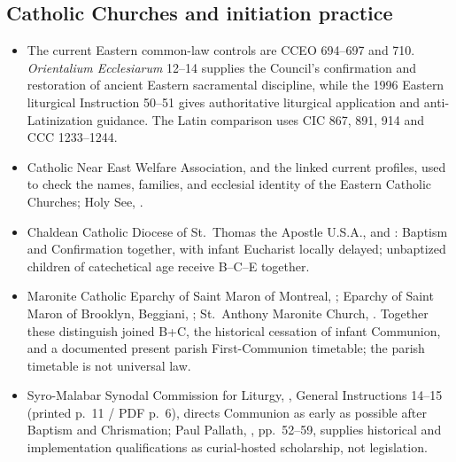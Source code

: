 \subsection*{Catholic Churches  and initiation practice}
{\footnotesize
\begin{itemize}[nosep]
\item The current Eastern common-law controls are CCEO 694--697 and 710. \emph{Orientalium Ecclesiarum} 12--14 supplies the Council's confirmation and restoration of ancient Eastern sacramental discipline, while the 1996 Eastern liturgical Instruction 50--51 gives authoritative liturgical application and anti-Latinization guidance. The Latin comparison uses CIC 867, 891, 914 and CCC 1233--1244.
\item Catholic Near East Welfare Association,  and the linked current profiles, used to check the names, families, and ecclesial identity of the Eastern Catholic Churches; Holy See, .
\item Chaldean Catholic Diocese of St.~Thomas the Apostle U.S.A.,  and : Baptism and Confirmation together, with infant Eucharist locally delayed; unbaptized children of catechetical age receive B--C--E together.
\item Maronite Catholic Eparchy of Saint Maron of Montreal, ; Eparchy of Saint Maron of Brooklyn, Beggiani, ; St.~Anthony Maronite Church, . Together these distinguish joined B+C, the historical cessation of infant Communion, and a documented present parish First-Communion timetable; the parish timetable is not universal law.
\item Syro-Malabar Synodal Commission for Liturgy, , General Instructions 14--15 (printed p.~11 / PDF p.~6), directs Communion as early as possible after Baptism and Chrismation; Paul Pallath, , pp.~52--59, supplies historical and implementation qualifications as curial-hosted scholarship, not legislation.
\end{itemize}
}
